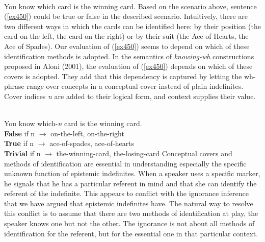 \documentclass[output=paper,
modfonts
]{langsci/langscibook}
\begin{document}
\ea\label{ex450}\\
 You know which card is the winning card.
\z Based on the scenario above, sentence (\ref{ex450}) could be true or false in the described scenario. Intuitively, there are two different ways in which the cards can be identified here: by their position (the card on the left, the card on the right) or by their suit (the Ace of Hearts, the Ace of Spades). Our evaluation of (\ref{ex450}) seems to depend on which of these identification methods is adopted. In the semantics of \emph{knowing-wh} constructions proposed in Aloni (2001), the evaluation of (\ref{ex450}) depends on which of these covers is adopted. They add that this dependency is captured by letting the wh-phrase range over concepts in a conceptual cover instead of plain indefinites. Cover indices \emph{n} are added to their logical form, and context supplies their value. 


\ea\label{ex45}\\
 You know which-\emph{n} card is the winning card.\\
 \textbf{False} if n $\longrightarrow$ {on-the-left, on-the-right}\\
 \textbf{True} if n $\longrightarrow$ {ace-of-spades, ace-of-hearts} \\
 \textbf{Trivial} if n $\longrightarrow$ {the-winning-card, the-losing-card}
\z 
Conceptual covers and methods of identification are essential in understanding especially the specific unknown function of epistemic indefinites. When a speaker uses a specific marker, he signals that he has a particular referent in mind and that she can identify the referent of the indefinite. This appears to conflict with the ignorance inference that we have argued that epistemic indefinites have. The natural way to resolve this conflict is to assume that there are two methods of identification at play, the speaker knows one but not the other. The ignorance is not about all methods of identification for the referent, but for the essential one in that particular context.  
\end{document}
